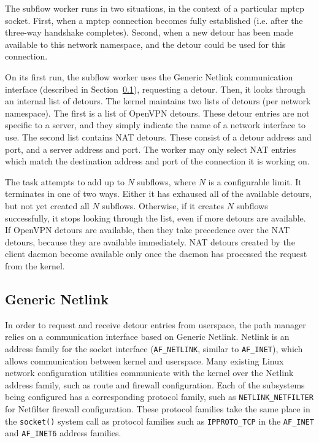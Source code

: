 \documentclass{cwru}
\begin{document}
The subflow worker runs in two situations, in the context of a particular
\ac{mptcp} socket. First, when a \ac{mptcp} connection becomes fully established
(i.e. after the three-way handshake completes). Second, when a new detour has
been made available to this network namespace, and the detour could be used for
this connection.

On its first run, the subflow worker uses the Generic Netlink communication
interface (described in Section~\ref{s:genl}), requesting a detour. Then, it
looks through an internal list of detours. The kernel maintains two lists of
detours (per network namespace). The first is a list of OpenVPN detours. These
detour entries are not specific to a server, and they simply indicate the name
of a network interface to use. The second list contains NAT detours. These
consist of a detour address and port, and a server address and port. The worker
may only select NAT entries which match the destination address and port of the
connection it is working on.

The task attempts to add up to $N$ subflows, where $N$ is a configurable limit.
It terminates in one of two ways. Either it has exhaused all of the available
detours, but not yet created all $N$ subflows. Otherwise, if it creates $N$
subflows successfully, it stops looking through the list, even if more detours
are available. If OpenVPN detours are available, then they take precedence over
the NAT detours, because they are available immediately. NAT detours created by
the client daemon become available only once the daemon has processed the
request from the kernel.

\subsection{Generic Netlink}
\label{s:genl}

In order to request and receive detour entries from userspace, the path manager
relies on a communication interface based on Generic Netlink. Netlink is an
address family for the socket interface (\texttt{AF\_NETLINK}, similar to
\texttt{AF\_INET}), which allows communication between kernel and userspace.
Many existing Linux network configuration utilities communicate with the kernel
over the Netlink address family, such as route and firewall configuration. Each
of the subsystems being configured has a corresponding protocol family, such as
\texttt{NETLINK\_NETFILTER} for Netfilter firewall configuration. These protocol
families take the same place in the \texttt{socket()} system call as protocol
families such as \texttt{IPPROTO\_TCP} in the \texttt{AF\_INET} and
\texttt{AF\_INET6} address families.
\end{document}

